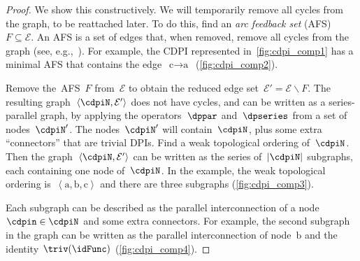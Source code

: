 \begin{proof}
We show this constructively. We will temporarily remove all cycles
from the graph, to be reattached later. To do this, find an \emph{arc
feedback set} (AFS) $F\subseteq\mathcal{E}$. An AFS is a set of edges
that, when removed, remove all cycles from the graph (see, e.g.,~\cite{golovach15incremental}).
For example, the CDPI represented in~\cref{fig:cdpi_comp1} has a minimal
AFS that contains the edge~$\text{c}\rightarrow\text{a}$~(\cref{fig:cdpi_comp2}).


Remove the~AFS~$F$ from~$\mathcal{E}$ to obtain the reduced edge
set~$\mathcal{E}'=\mathcal{E}\backslash F$.  The resulting graph~$\left\langle \cdpiN,\mathcal{E}'\right\rangle $
does not have cycles, and can be written as a series-parallel graph,
by applying the operators~$\dppar$ and~$\dpseries$ from a set
of nodes~$\cdpiN'$. The nodes~$\cdpiN'$ will contain~$\cdpiN$,
plus some extra ``connectors'' that are trivial DPIs. Find a weak
topological ordering of~$\cdpiN$. Then the graph~$\left\langle \cdpiN,\mathcal{E}'\right\rangle $
can be written as the series of~$|\cdpiN|$ subgraphs, each containing
one node of~$\cdpiN$. In the example, the weak topological ordering
is~$\left\langle \text{a},\text{b},\text{c}\right\rangle $ and there
are three subgraphs (\cref{fig:cdpi_comp3}).


\noindent Each subgraph can be described as the parallel interconnection
of a node~$\cdpin\in\cdpiN$ and some extra connectors. For example,
the second subgraph in the graph can be written as the parallel interconnection
of node~$\text{b}$ and the identity $\triv(\idFunc)$ (\cref{fig:cdpi_comp4}).



\end{proof}
